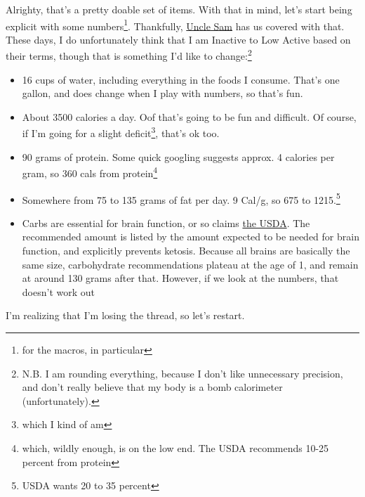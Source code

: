 \documentclass[12pt]{article}[titlepage]
\renewcommand{\,}{\textsuperscript{,}}
\begin{document}
Alrighty, that's a pretty doable set of items. With that in mind, let's start being explicit with some numbers\footnote{for the macros, in particular}. Thankfully, \href{https://www.nal.usda.gov/human-nutrition-and-food-safety/dri-calculator}{Uncle Sam} has us covered with that. These days, I do unfortunately think that I am Inactive to Low Active based on their terms, though that is something I'd like to change:\footnote{N.B. I am rounding everything, because I don't like unnecessary precision, and don't really believe that my body is a bomb calorimeter (unfortunately).}  


\begin{itemize}  
\item 16 cups of water, including everything in the foods I consume. That's one gallon, and does change when I play with numbers, so that's fun.  
\item About 3500 calories a day. Oof that's going to be fun and difficult. Of course, if I'm going for a slight deficit\footnote{which I kind of am}, that's ok too.  
\item 90 grams of protein. Some quick googling suggests approx. 4 calories per gram, so 360 cals from protein\footnote{which, wildly enough, is on the low end. The USDA recommends 10-25 percent from protein}  
\item Somewhere from 75 to 135 grams of fat per day. 9 Cal/g, so 675 to 1215.\footnote{USDA wants 20 to 35 percent}  
\item Carbs are essential for brain function, or so claims \href{https://nap.nationalacademies.org/read/11537/chapter/10#103}{the USDA}. The recommended amount is listed by the amount expected to be needed for brain function, and explicitly prevents ketosis. Because all brains are basically the same size, carbohydrate recommendations plateau at the age of 1, and remain at around 130 grams after that. However, if we look at the numbers, that doesn't work out   
\end{itemize}

I'm realizing that I'm losing the thread, so let's restart.  
\end{document}
